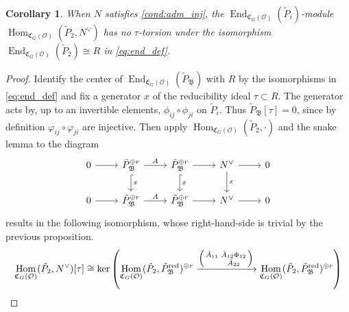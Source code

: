 \documentclass[leqno]{amsart}
\newcommand{\smat}[1]{\left( \begin{smallmatrix} #1 \end{smallmatrix} \right)}
\newcommand{\red}{\textnormal{red}}
\newcommand{\oo}{\mathcal O}
\newcommand{\1}{\mathbf{1}}
\newcommand{\fC}{\mathfrak C}
\newcommand{\B}{\mathfrak B}
\DeclareMathOperator{\End}{End}
\DeclareMathOperator{\Hom}{Hom}
\newtheorem{cor}[thm]{Corollary}
\theoremstyle{definition}
\theoremstyle{remark}
\begin{document}
\begin{cor}
	When $N$ satisfies \eqref{cond:adm_inj},
	the $\End_{\fC_{G}(\oo)}(\tilde{P}_i)$-module
	$\Hom_{\fC_G(\oo)}(\tilde{P}_2, N^\vee)$
	has no $\tau$-torsion 
	under the isomorphism $\End_{\fC_{G}(\oo)}(\tilde{P}_2)\cong R$
	in \eqref{eq:end_def}.
\end{cor}
\begin{proof}
	Identify the center of $\End_{\fC_{G}(\oo)}(\tilde{P}_\B)$ 
	with $R$ by the isomorphisms
	in \eqref{eq:end_def}
	and fix a generator $x$ of the reducibility ideal  $\tau\subset R$.
	The generator acts by, up to an invertible elements,
	$\phi_{ij}\circ\phi_{ji}$ on $\tilde{P}_i$.
	Thus $\tilde{P}_\B[\tau]=0$,
	since by definition $\varphi_{ij}\circ\varphi_{ji}$ are injective.
	Then apply 
	$\Hom_{\fC_G(\oo)}(\tilde{P}_2,\cdot)$
	and the snake lemma to the diagram
    \begin{equation*}
    \begin{tikzcd}
        0 \arrow[r] & \tilde{P}_\B^{\oplus r} 
	\arrow[d,"x",hookrightarrow] \arrow[r,"A"] & 
	\tilde{P}_\B^{\oplus r} 
	\arrow[d,"x",hookrightarrow] \arrow[r] & 
	N^\vee \arrow[d,"x"] \arrow[r] & 0 \\ 
        0 \arrow[r] & \tilde{P}_\B^{\oplus r}
	\arrow[r,"A"] & \tilde{P}_\B^{\oplus r}
	\arrow[r] &N^\vee  \arrow[r] & 0 
    \end{tikzcd}
\end{equation*}
results in the following isomorphism,
whose right-hand-side
is trivial by the previous proposition.
\[
\Hom_{\fC_G(\oo)}(\tilde{P}_2, N^\vee)[\tau]\cong 
\ker\left(
	\Hom_{\fC_G(\oo)}(\tilde{P}_2, \tilde{P}_\B^{\red})^{\oplus r}
\xrightarrow{\smat{\bar{A}_{11}& \bar{A}_{12}\Phi_{12}\\& \bar{A}_{22}}}
\Hom_{\fC_G(\oo)}(\tilde{P}_2, \tilde{P}_\B^{\red})^{\oplus r} \right)
\]\qedhere
\end{proof}
\end{document}
